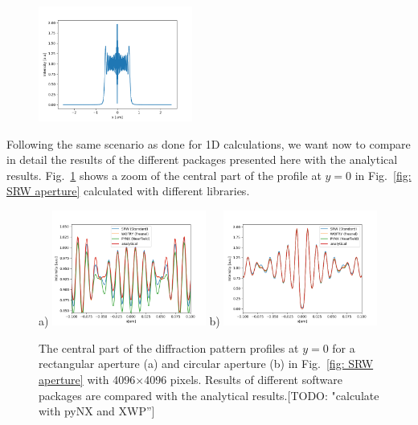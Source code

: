 \documentclass{iucr}              %
\newcommand{\todo}[1]{{\color{red}[TODO: "#1'']}}
\begin{document}
\begin{figure}
\includegraphics[width=0.45\textwidth]{aperture_2D_circular_profile_srw.png}
\end{figure}

Following the same scenario as done for 1D calculations, we want now to compare in detail the results of the different packages presented here with the analytical results. Fig.~\ref{fig: 2D aperture comparison} shows a zoom of the central part of the profile at $y=0$ in Fig.~\ref{fig: SRW aperture} calculated with different libraries. 

\begin{figure}\label{fig: 2D aperture comparison}
\caption{The central part of the diffraction pattern profiles at $y=0$ for a rectangular aperture (a) and circular aperture (b) in Fig.~\ref{fig: SRW aperture} with 4096$\times$4096 pixels. Results of different software packages are compared with the analytical results.\todo{calculate with pyNX and XWP}
}
a)
\includegraphics[width=0.45\textwidth]{aperture_2D_rectangular_profile_comparison.png}
b)
\includegraphics[width=0.45\textwidth]{aperture_2D_circular_profile_comparison.png}
\end{figure}
\end{document}
